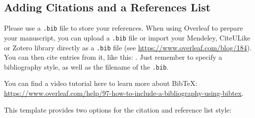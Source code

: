 \documentclass[alpha-refs,serif]{ecotropicos-article}
\begin{document}
\begin{multicols}{2}
\subsection*{Adding Citations and a References List}

Please use a \verb|.bib| file to store your references. When using Overleaf to prepare your manuscript, you can upload a \verb|.bib| file or import your Mendeley, CiteULike or Zotero library directly as a \verb|.bib| file (see \url{https://www.overleaf.com/blog/184}). You can then cite entries from it, like this: \cite{lees2010theoretical}. Just remember to specify a bibliography style, as well as the filename of the \verb|.bib|.

You can find a video tutorial here to learn more about BibTeX: \url{https://www.overleaf.com/help/97-how-to-include-a-bibliography-using-bibtex}.

This template provides two options for the citation and reference list style:
\end{multicols}
\end{document}
